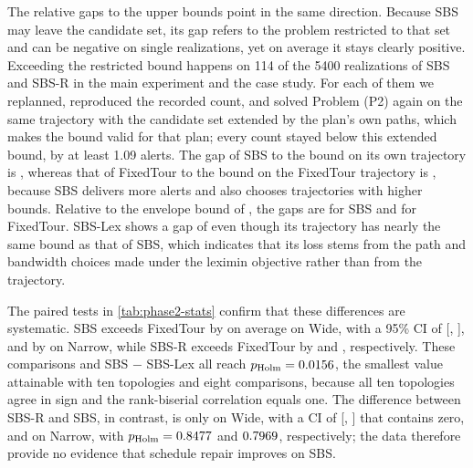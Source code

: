 The relative gaps to the upper bounds point in the same direction. Because SBS may leave the candidate set, its gap refers to the problem restricted to that set and can be negative on single realizations, yet on average it stays clearly positive. Exceeding the restricted bound happens on 114 of the \num{5400} realizations of SBS and SBS-R in the main experiment and the case study. For each of them we replanned, reproduced the recorded count, and solved Problem (P2) again on the same trajectory with the candidate set extended by the plan's own paths, which makes the bound valid for that plan; every count stayed below this extended bound, by at least \num{1.09} alerts. The gap of SBS to the bound on its own trajectory is \ResultTwoGapVzeroBtwo, whereas that of FixedTour to the bound on the FixedTour trajectory is \ResultTwoGapVzeroBone, because SBS delivers more alerts and also chooses trajectories with higher bounds. Relative to the envelope bound of \ResultTwoUnionBoundVzeroBtwo, the gaps are \ResultTwoUnionGapVzeroBtwo{} for SBS and \ResultTwoUnionGapVzeroBone{} for FixedTour. SBS-Lex shows a gap of \ResultTwoGapVzeroBthree{} even though its trajectory has nearly the same bound as that of SBS, which indicates that its loss stems from the path and bandwidth choices made under the leximin objective rather than from the trajectory.

\label{sec:results-stats}


The paired tests in \cref{tab:phase2-stats} confirm that these differences are systematic. SBS exceeds FixedTour by \ResultTwoDiffVzeroBtwoBone{} on average on Wide, with a 95\% CI of [\ResultTwoDiffLowVzeroBtwoBone, \ResultTwoDiffHighVzeroBtwoBone], and by \ResultTwoDiffVzeroBhfivezeroBtwoBone{} on Narrow, while SBS-R exceeds FixedTour by \ResultTwoDiffVzeroPBone{} and \ResultTwoDiffVzeroBhfivezeroPBone, respectively. These comparisons and SBS $-$ SBS-Lex all reach $p_{\mathrm{Holm}}=\num{0.0156}$, the smallest value attainable with ten topologies and eight comparisons, because all ten topologies agree in sign and the rank-biserial correlation equals one. The difference between SBS-R and SBS, in contrast, is only \ResultTwoDiffVzeroPBtwo{} on Wide, with a CI of [\ResultTwoDiffLowVzeroPBtwo, \ResultTwoDiffHighVzeroPBtwo] that contains zero, and \ResultTwoDiffVzeroBhfivezeroPBtwo{} on Narrow, with $p_{\mathrm{Holm}}=\num{0.8477}$ and $\num{0.7969}$, respectively; the data therefore provide no evidence that schedule repair improves on SBS.

